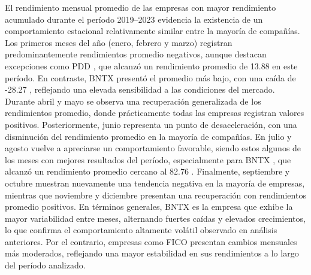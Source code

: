 El rendimiento mensual promedio de las empresas con mayor rendimiento acumulado durante el período 2019–2023 evidencia la existencia de un comportamiento estacional relativamente similar entre la mayoría de compañías. Los primeros meses del año (enero, febrero y marzo) registran predominantemente rendimientos promedio negativos, aunque destacan excepciones como
PDD
, que alcanzó un rendimiento promedio de
13.88%
en este período. En contraste,
BNTX
presentó el promedio más bajo, con una caída de
-28.27%
, reflejando una elevada sensibilidad a las condiciones del mercado.
Durante abril y mayo se observa una recuperación generalizada de los rendimientos promedio, donde prácticamente todas las empresas registran valores positivos. Posteriormente, junio representa un punto de desaceleración, con una disminución del rendimiento promedio en la mayoría de compañías. En julio y agosto vuelve a apreciarse un comportamiento favorable, siendo estos algunos de los meses con mejores resultados del período, especialmente para
BNTX
, que alcanzó un rendimiento promedio cercano al
82.76%
.
Finalmente, septiembre y octubre muestran nuevamente una tendencia negativa en la mayoría de empresas, mientras que noviembre y diciembre presentan una recuperación con rendimientos promedio positivos. En términos generales,
BNTX
es la empresa que exhibe la mayor variabilidad entre meses, alternando fuertes caídas y elevados crecimientos, lo que confirma el comportamiento altamente volátil observado en análisis anteriores. Por el contrario, empresas como
FICO
presentan cambios mensuales más moderados, reflejando una mayor estabilidad en sus rendimientos a lo largo del período analizado.